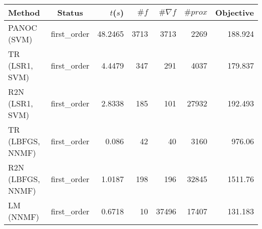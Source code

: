\begin{tabular}{lcrrrrr}
  \hline
  \textbf{Method} & \textbf{Status} & \textbf{$t$($s$)} & \textbf{$\#f$} & \textbf{$\#\nabla f$} & \textbf{$\#prox$} & \textbf{Objective} \\\hline
  PANOC (SVM) & first\_order & 48.2465 & 3713 & 3713 & 2269 & 188.924 \\
  TR (LSR1, SVM) & first\_order & 4.4479 & 347 & 291 & 4037 & 179.837 \\
  R2N (LSR1, SVM) & first\_order & 2.8338 & 185 & 101 & 27932 & 192.493 \\
  TR (LBFGS, NNMF) & first\_order & 0.086 & 42 & 40 & 3160 & 976.06 \\
  R2N (LBFGS, NNMF) & first\_order & 1.0187 & 198 & 196 & 32845 & 1511.76 \\
  LM (NNMF) & first\_order & 0.6718 & 10 & 37496 & 17407 & 131.183 \\\hline
\end{tabular}
